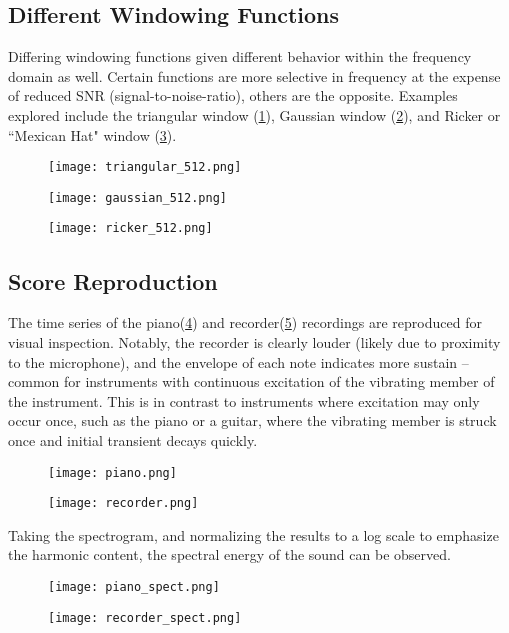 \documentclass[journal]{IEEEtran}
\begin{document}
\subsection{Different Windowing Functions}
Differing windowing functions given different behavior within the frequency domain as well. Certain functions are more selective in frequency at the expense of reduced SNR (signal-to-noise-ratio), others are the opposite.
Examples explored include the triangular window (\ref{triangle_spectrum}), Gaussian window (\ref{gaussian_spectrum}), and Ricker or ``Mexican Hat" window (\ref{ricker_spectrum}).

\begin{figure}
	\centerline{\texttt{[image: triangular\_512.png]}}
	\caption{}
	\label{triangle_spectrum}
\end{figure}
\begin{figure}
	\centerline{\texttt{[image: gaussian\_512.png]}}
	\caption{}
	\label{gaussian_spectrum}
\end{figure}
\begin{figure}
	\centerline{\texttt{[image: ricker\_512.png]}}
	\caption{}
	\label{ricker_spectrum}
\end{figure}

\subsection{Score Reproduction}
The time series of the piano(\ref{piano}) and recorder(\ref{recorder}) recordings are reproduced for visual inspection.
Notably, the recorder is clearly louder (likely due to proximity to the microphone), and the envelope of each note
indicates more sustain -- common for instruments with continuous excitation of the vibrating member of the instrument.
This is in contrast to instruments where excitation may only occur once, such as the piano or a guitar, where the
vibrating member is struck once and initial transient decays quickly.

\begin{figure}
	\centerline{\texttt{[image: piano.png]}}
	\caption{}
	\label{piano}
\end{figure}
\begin{figure}
	\centerline{\texttt{[image: recorder.png]}}
	\caption{}
	\label{recorder}
\end{figure}

Taking the spectrogram, and normalizing the results to a log scale to emphasize the harmonic content, the
spectral energy of the sound can be observed.
\begin{figure}
	\centerline{\texttt{[image: piano\_spect.png]}}
	\caption{}
	\label{piano_spect}
\end{figure}
\begin{figure}
	\centerline{\texttt{[image: recorder\_spect.png]}}
	\caption{}
	\label{recorder_spect}
\end{figure}
\end{document}
